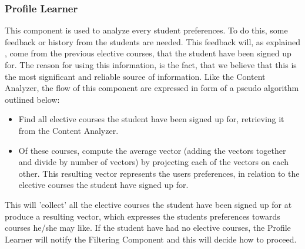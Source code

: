 \subsubsection{Profile Learner}
This component is used to analyze every student preferences. To do this, some feedback or history from the students are needed. This feedback will, as explained , come from the previous elective courses, that the student have been signed up for. The reason for using this information, is the fact, that we believe that this is the most significant and reliable source of information. Like the Content Analyzer, the flow of this component are expressed in form of a pseudo algorithm outlined below:
\begin{itemize}
	\item Find all elective courses the student have been signed up for, retrieving it from the Content Analyzer.
	\item Of these courses, compute the average vector (adding the vectors together and divide by number of vectors) by projecting each of the vectors on each other. This resulting vector represents the users preferences, in relation to the elective courses the student have signed up for. 
\end{itemize}
This will 'collect' all the elective courses the student have been signed up for at produce a resulting vector, which expresses the students preferences towards courses he/she may like. If the student have had no elective courses, the Profile Learner will notify the Filtering Component and this will decide how to proceed. 

